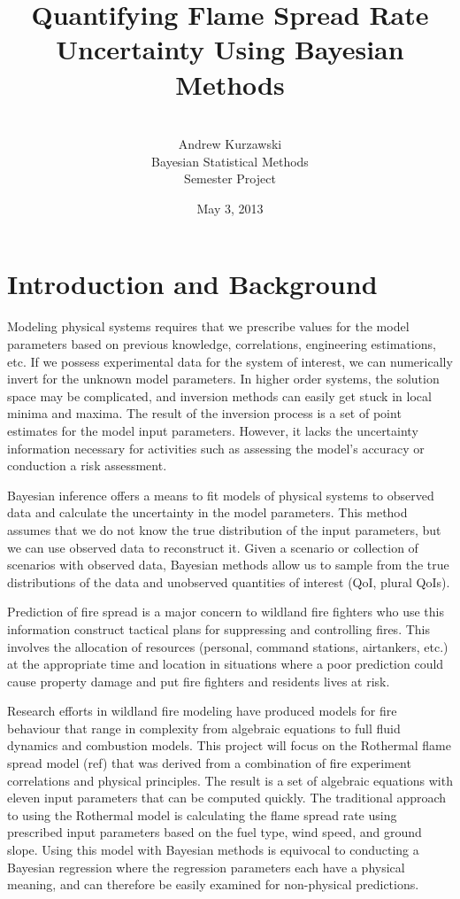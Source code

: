 \documentclass[11pt]{article}
\title{Quantifying Flame Spread Rate Uncertainty Using Bayesian Methods}
\author{
        \\
        Andrew Kurzawski \\
        Bayesian Statistical Methods \\ 
        Semester Project \\
}
\date{May 3, 2013}
\begin{document}
\maketitle

\clearpage

\pagestyle{plain}


\section{Introduction and Background}

Modeling physical systems requires that we prescribe values for the model parameters based on previous knowledge, correlations, engineering estimations, etc. If we possess experimental data for the system of interest, we can numerically invert for the unknown model parameters. In higher order systems, the solution space may be complicated, and inversion methods can easily get stuck in local minima and maxima. The result of the inversion process is a set of point estimates for the model input parameters. However, it lacks the uncertainty information necessary for activities such as assessing the model's accuracy or conduction a risk assessment.

Bayesian inference offers a means to fit models of physical systems to observed data and calculate the uncertainty in the model parameters. This method assumes that we do not know the true distribution of the input parameters, but we can use observed data to reconstruct it. Given a scenario or collection of scenarios with observed data, Bayesian methods allow us to sample from the true distributions of the data and unobserved quantities of interest (QoI, plural QoIs).

Prediction of fire spread is a major concern to wildland fire fighters who use this information construct tactical plans for suppressing and controlling fires. This involves the allocation of resources (personal, command stations, airtankers, etc.) at the appropriate time and location in situations where a poor prediction could cause property damage and put fire fighters and residents lives at risk.

Research efforts in wildland fire modeling have produced models for fire behaviour that range in complexity from algebraic equations to full fluid dynamics and combustion models. This project will focus on the Rothermal flame spread model (ref) that was derived from a combination of fire experiment correlations and physical principles. The result is a set of algebraic equations with eleven input parameters that can be computed quickly. The traditional approach to using the Rothermal model is calculating the flame spread rate using prescribed input parameters based on the fuel type, wind speed, and ground slope. Using this model with Bayesian methods is equivocal to conducting a Bayesian regression where the regression parameters each have a physical meaning, and can therefore be easily examined for non-physical predictions.
\end{document}
